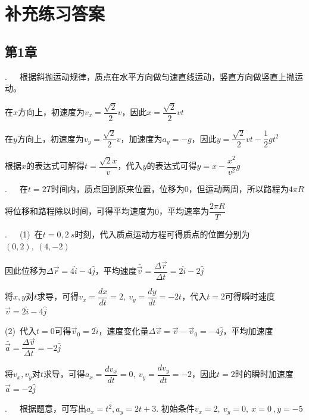 
\chapter*{补充练习答案}

\section*{第1章}

.~~~根据斜抛运动规律，质点在水平方向做匀速直线运动，竖直方向做竖直上抛运动。

在$x$方向上，初速度为$v_x=\dfrac{\sqrt{2}}{2}v$，因此$x=\dfrac{\sqrt{2}}{2}vt$

在$y$方向上，初速度为$v_y=\dfrac{\sqrt{2}}{2}v$，加速度为$a_y=-g$，因此$y=\dfrac{\sqrt{2}}{2}vt-\dfrac{1}{2}gt^2$

根据$x$的表达式可解得$t=\dfrac{\sqrt{2}x}{v}$，代入$y$的表达式可得$y=x-\dfrac{x^2}{v^2}g$


\noindent\hdashrule{\textwidth}{1pt}{1pt}

.~~~在$t=2T$时间内，质点回到原来位置，位移为$0$，但运动两周，所以路程为$4\pi R$

将位移和路程除以时间，可得平均速度为$0$，平均速率为$\dfrac{2\pi R}{T}$

\noindent\hdashrule{\textwidth}{1pt}{1pt}

.~~~(1)~在$t=0,\SI{2}{s}$时刻，代入质点运动方程可得质点的位置分别为$(0,2),~(4,-2)$

因此位移为$\Delta \vec{r}=4\hat{i}-4\hat{j}$，平均速度$\bar{\vec{v}}=\dfrac{\Delta \vec{r}}{\Delta t}=2\hat{i}-2\hat{j}$

将$x,y$对$t$求导，可得$v_x=\dfrac{dx}{dt}=2,~v_y=\dfrac{dy}{dt}=-2t$，代入$t=2$可得瞬时速度$\vec{v}=2\hat{i}-4\hat{j}$

(2)~代入$t=0$可得$\vec{v}_0=2\hat{i}$，速度变化量$\Delta \vec{v}=\vec{v}-\vec{v}_0=-4\hat{j}$，平均加速度$\bar{\vec{a}}=\dfrac{\Delta \vec{v}}{\Delta t}=-2\hat{j}$

将$v_x,v_y$对$t$求导，可得$a_x=\dfrac{dv_x}{dt}=0,~v_y=\dfrac{dv_y}{dt}=-2$，因此$t=2$时的瞬时加速度$\vec{a}=-2\hat{j}$

\noindent\hdashrule{\textwidth}{1pt}{1pt}

.~~~根据题意，可写出$a_x=t^2,a_y=2t+3$. 初始条件$v_x=2,~v_y=0,~x=0~,y=-5$

\vspace{0.25em}

